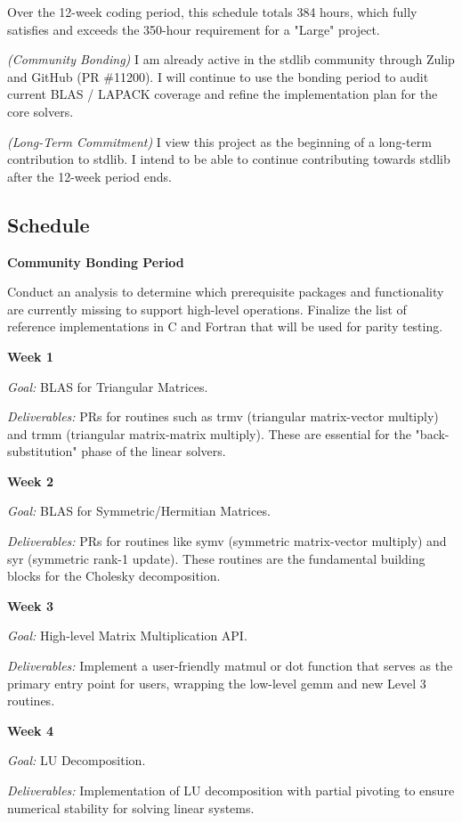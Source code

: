 \documentclass[
	a4paper,
	12pt
]{article}
\begin{document}
Over the 12-week coding period, this schedule totals 384 hours, which fully satisfies and exceeds the 350-hour requirement for a "Large" project.

\textit{(Community Bonding)} I am already active in the stdlib community through Zulip and GitHub (PR \#11200). I will continue to use the bonding period to audit current BLAS / LAPACK coverage and refine the implementation plan for the core solvers.

\textit{(Long-Term Commitment)} I view this project as the beginning of a long-term contribution to stdlib. I intend to be able to continue contributing towards stdlib after the 12-week period ends.

\pagebreak
\subsection{Schedule}

\textbf{Community Bonding Period}

Conduct an analysis to determine which prerequisite packages and functionality are currently missing to support high-level operations. Finalize the list of reference implementations in C and Fortran that will be used for parity testing.

\textbf{Week 1}

\textit{Goal:} BLAS for Triangular Matrices.

\textit{Deliverables:} PRs for routines such as trmv (triangular matrix-vector multiply) and trmm (triangular matrix-matrix multiply). These are essential for the "back-substitution" phase of the linear solvers.

\textbf{Week 2}

\textit{Goal:} BLAS for Symmetric/Hermitian Matrices.

\textit{Deliverables:} PRs for routines like symv (symmetric matrix-vector multiply) and syr (symmetric rank-1 update). These routines are the fundamental building blocks for the Cholesky decomposition.

\textbf{Week 3}

\textit{Goal:} High-level Matrix Multiplication API.

\textit{Deliverables:} Implement a user-friendly matmul or dot function that serves as the primary entry point for users, wrapping the low-level gemm and new Level 3 routines.

\textbf{Week 4}

\textit{Goal:} LU Decomposition.

\textit{Deliverables:} Implementation of LU decomposition with partial pivoting to ensure numerical stability for solving linear systems.
\end{document}
